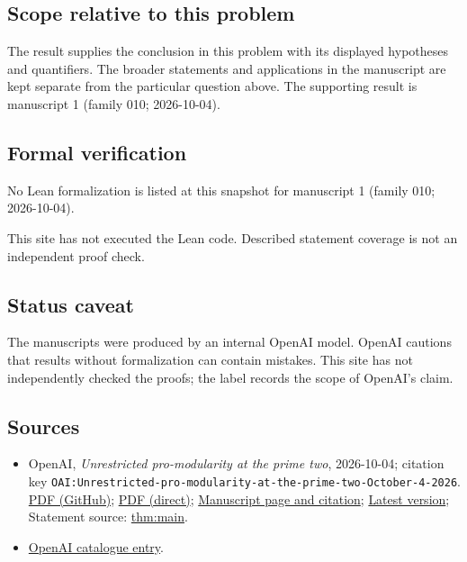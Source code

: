 \documentclass[11pt]{article}
\begin{document}
\subsection{Scope relative to this problem}
The result supplies the conclusion in this problem with its displayed hypotheses and quantifiers. The broader statements and applications in the manuscript are kept separate from the particular question above. The supporting result is manuscript 1 (family 010; 2026-10-04).

\subsection{Formal verification}
No Lean formalization is listed at this snapshot for manuscript 1 (family 010; 2026-10-04).

This site has not executed the Lean code. Described statement coverage is not an independent proof check.

\subsection{Status caveat}
The manuscripts were produced by an internal OpenAI model. OpenAI cautions that results without formalization can contain mistakes. This site has not independently checked the proofs; the label records the scope of OpenAI's claim.

\subsection{Sources}
\begin{itemize}
\item OpenAI, \emph{Unrestricted pro-modularity at the prime two}, 2026-10-04; citation key \texttt{OAI:Unrestricted-pro-modularity-at-the-prime-two-October-4-2026}. \href{https://github.com/openai/math/blob/adc7f1241b42e322a6451854ab7e4b4c146bf78a/preprints/Unrestricted-pro-modularity-at-the-prime-two-October-4-2026/two-adic-promodularity.pdf}{PDF (GitHub)}; \href{https://github.com/openai/math/raw/adc7f1241b42e322a6451854ab7e4b4c146bf78a/preprints/Unrestricted-pro-modularity-at-the-prime-two-October-4-2026/two-adic-promodularity.pdf}{PDF (direct)}; \href{https://github.com/openai/math/blob/adc7f1241b42e322a6451854ab7e4b4c146bf78a/preprints/Unrestricted-pro-modularity-at-the-prime-two-October-4-2026/README.md}{Manuscript page and citation}; \href{https://github.com/openai/math/blob/main/preprints/Unrestricted-pro-modularity-at-the-prime-two-October-4-2026/two-adic-promodularity.pdf}{Latest version}; Statement source: \href{https://github.com/openai/math/blob/adc7f1241b42e322a6451854ab7e4b4c146bf78a/preprints/Unrestricted-pro-modularity-at-the-prime-two-October-4-2026/build/source/sections/introduction.tex\#L33}{thm:main}.
\item \href{https://github.com/openai/math/blob/adc7f1241b42e322a6451854ab7e4b4c146bf78a/CONTENTS.md}{OpenAI catalogue entry}.
\end{itemize}
\end{document}
